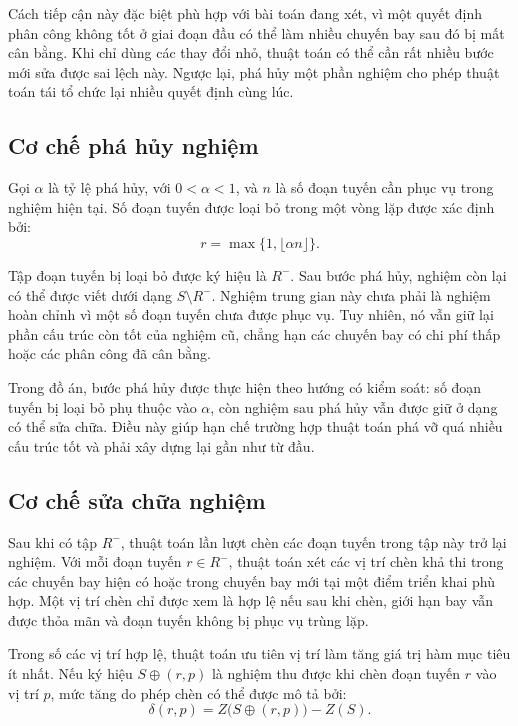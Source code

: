 Cách tiếp cận này đặc biệt phù hợp với bài toán đang xét, vì một quyết định phân công không tốt ở giai đoạn đầu có thể làm nhiều chuyến bay sau đó bị mất cân bằng. Khi chỉ dùng các thay đổi nhỏ, thuật toán có thể cần rất nhiều bước mới sửa được sai lệch này. Ngược lại, phá hủy một phần nghiệm cho phép thuật toán tái tổ chức lại nhiều quyết định cùng lúc.

\subsection{Cơ chế phá hủy nghiệm}

Gọi $\alpha$ là tỷ lệ phá hủy, với $0 < \alpha < 1$, và $n$ là số đoạn tuyến cần phục vụ trong nghiệm hiện tại. Số đoạn tuyến được loại bỏ trong một vòng lặp được xác định bởi:
\begin{equation}
    r = \max\{1, \lfloor \alpha n \rfloor\}.
    \label{eq:chapter3-lns-destroy-size}
\end{equation}

Tập đoạn tuyến bị loại bỏ được ký hiệu là $R^-$. Sau bước phá hủy, nghiệm còn lại có thể được viết dưới dạng $S \setminus R^-$. Nghiệm trung gian này chưa phải là nghiệm hoàn chỉnh vì một số đoạn tuyến chưa được phục vụ. Tuy nhiên, nó vẫn giữ lại phần cấu trúc còn tốt của nghiệm cũ, chẳng hạn các chuyến bay có chi phí thấp hoặc các phân công đã cân bằng.

Trong đồ án, bước phá hủy được thực hiện theo hướng có kiểm soát: số đoạn tuyến bị loại bỏ phụ thuộc vào $\alpha$, còn nghiệm sau phá hủy vẫn được giữ ở dạng có thể sửa chữa. Điều này giúp hạn chế trường hợp thuật toán phá vỡ quá nhiều cấu trúc tốt và phải xây dựng lại gần như từ đầu.

\subsection{Cơ chế sửa chữa nghiệm}

Sau khi có tập $R^-$, thuật toán lần lượt chèn các đoạn tuyến trong tập này trở lại nghiệm. Với mỗi đoạn tuyến $r \in R^-$, thuật toán xét các vị trí chèn khả thi trong các chuyến bay hiện có hoặc trong chuyến bay mới tại một điểm triển khai phù hợp. Một vị trí chèn chỉ được xem là hợp lệ nếu sau khi chèn, giới hạn bay vẫn được thỏa mãn và đoạn tuyến không bị phục vụ trùng lặp.

Trong số các vị trí hợp lệ, thuật toán ưu tiên vị trí làm tăng giá trị hàm mục tiêu ít nhất. Nếu ký hiệu $S \oplus (r,p)$ là nghiệm thu được khi chèn đoạn tuyến $r$ vào vị trí $p$, mức tăng do phép chèn có thể được mô tả bởi:
\begin{equation}
    \delta(r,p) = Z\bigl(S \oplus (r,p)\bigr) - Z(S).
    \label{eq:chapter3-lns-insertion-delta}
\end{equation}

